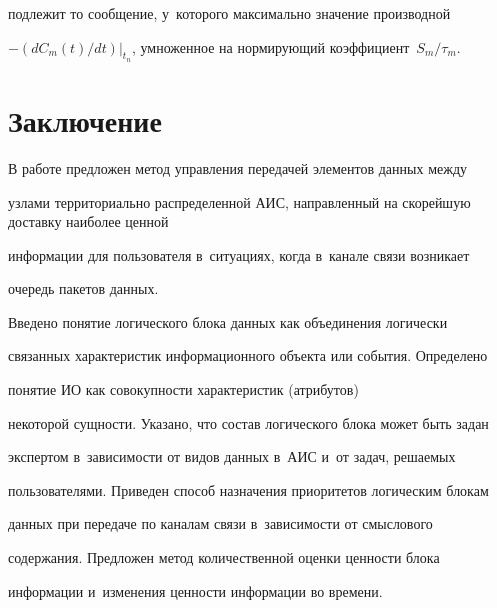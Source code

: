 подлежит то сообщение, у~которого максимально значение производной  


$-(dC_m(t)/dt)\vert_{t_n}$, умноженное на нор\-ми\-ру\-ющий коэффициент~$S_m/\tau_m$.





\vspace*{-4pt}





\section{Заключение}





\vspace*{-3pt}





  В работе предложен метод управления передачей элементов данных между 


узлами территориально распределенной АИС, направленный на скорейшую доставку наиболее ценной 


информации для пользователя в~ситуациях, когда в~канале связи возникает 


очередь пакетов данных.


  


  Введено понятие логического блока данных как объединения логически 


связанных характеристик информационного объекта или события. Определено 


понятие ИО как со\-во\-куп\-ности характеристик (атрибутов) 


некоторой сущности. Указано, что состав логического блока может быть задан 


экспертом в~за\-ви\-си\-мости от видов данных в~АИС и~от задач, решаемых 


пользователями. Приведен способ назначения приоритетов логическим блокам 


данных при передаче по каналам связи в~за\-ви\-си\-мости от смыс\-ло\-во\-го 


содержания. Предложен метод количественной оценки цен\-ности блока 


информации и~изменения цен\-ности информации во времени.





\vspace*{-4pt}


